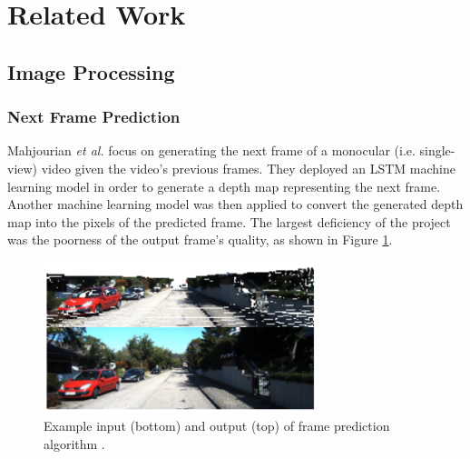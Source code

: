 \documentclass[letterpaper]{article} %
\begin{document}
\section{Related Work}
\label{sec:related_work}
\subsection{Image Processing}
\subsubsection{Next Frame Prediction}
Mahjourian \textit{et al.} \cite{next_frame_prediction}
focus on generating the
next frame of a monocular (i.e. single-view) video 
given the video's previous frames. They deployed
an LSTM machine learning model in order to generate a depth map representing the next frame.
Another machine learning model was then applied to convert the generated depth
map into the pixels of the predicted frame. The largest deficiency of the
project was the poorness of the output frame's quality, as shown in Figure
\ref{fig:frame_prediction}.

\begin{figure}[htbp]
\centerline{\includegraphics[width=8cm]{frame_prediction.png}}
\caption{Example input (bottom) and output (top) of frame prediction algorithm
\cite{next_frame_prediction}.}
\label{fig:frame_prediction}
\end{figure}
%
%
%
\end{document}
